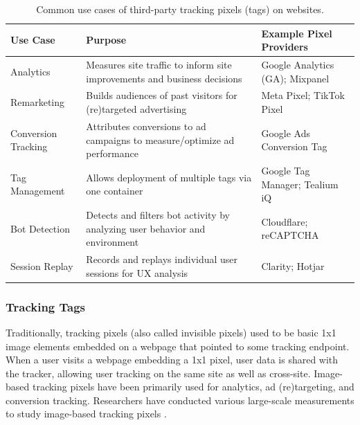 \begin{table}[ht]\small
\centering
\caption{Common use cases of third-party tracking pixels (tags) on websites.}
\label{tab:tracking-tags-usecases}
\renewcommand{\arraystretch}{1.3} %
\begin{tabular}{@{}p{2.65cm} p{9.7cm} p{4.6cm}@{}}
\toprule
\textbf{Use Case} & \textbf{Purpose} & \textbf{Example Pixel Providers} \\
\midrule
Analytics & Measures site traffic to inform site improvements and business decisions & Google Analytics (GA); Mixpanel \\[4pt]
\hline
Remarketing & Builds audiences of past visitors for (re)targeted advertising & Meta Pixel; TikTok Pixel \\[4pt]
\hline
Conversion Tracking & Attributes conversions to ad campaigns to measure/optimize ad performance & Google Ads Conversion Tag \\[4pt]
\hline
Tag Management & Allows deployment of multiple tags via one container & Google Tag Manager; Tealium iQ \\[4pt]
\hline
Bot Detection & Detects and filters bot activity by analyzing user behavior and environment & Cloudflare; reCAPTCHA \\[4pt]
\hline
Session Replay & Records and replays individual user sessions for UX analysis & Clarity; Hotjar \\
\bottomrule
\end{tabular}
\end{table}



\subsubsection{Tracking Tags}
Traditionally, tracking pixels (also called invisible pixels) used to be basic 1x1 image elements embedded on a webpage that pointed to some tracking endpoint.
%
When a user visits a webpage embedding a 1x1 pixel, user data is shared with the tracker, allowing user tracking on the same site as well as cross-site.
%
Image-based tracking pixels have been primarily used for analytics, ad (re)targeting, and conversion tracking. 
%
Researchers have conducted various large-scale measurements to study image-based tracking pixels \cite{Narayanan2017WebtapSpringer,englehardtOnlineTracking1millionsite2016,lernerInternetJonesRaiders2016, bekosHitchhikersGuideFacebook2023, agarwal2021under,vekaria2021differential}.

